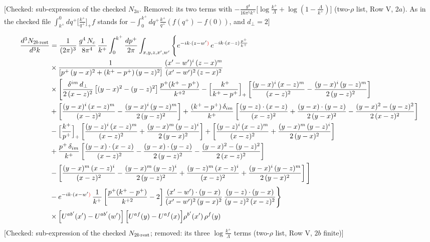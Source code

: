 \documentclass[9pt]{article}
\numberwithin{equation}{section}
\begin{document}
\begin{align}
\end{align} {\color{red}[Checked: sub-expression of the checked $N_{2a}$. Removed: its two terms with $-\frac{g^{4}}{16\pi^{5}k^{+}}\big[\log\frac{k^{+}}{\Lambda}+\log(1-\frac{\Lambda}{k^{+}})\big]$ (two-$\rho$ list, Row V, $2a$). As in the checked file $\int^{0}_{k^{+}}dq^{+}\big[\frac{k^{+}}{q^{+}}\big]_{+}f$ stands for $-\int_{0}^{k^{+}}dq^{+}\frac{k^{+}}{q^{+}}(f(q^{+})-f(0))$, and $d_{\perp}=2$]}\par\noindent 
\begin{align}
\frac{d^{3}N_{2b\,\rm rest}}{d^{3}k} & =\frac{1}{(2\pi)^{3}}\,\frac{g^{4}\,N_{c}}{8\pi^{4}}\,\frac{1}{k^{+}}\int_{0}^{k^{+}}\frac{dp^{+}}{2\pi}\int_{x,y,z,x',w'}\Bigg\{e^{-ik\cdot(z-w'{\color{red})}}\,e^{-ik\cdot(x-z)\frac{p^{+}}{k^{+}}}\notag \\ & \times\frac{1}{\left[p^{+}\,(y-x)^{2}+(k^{+}-p^{+})\,(y-z)^{2}\right]}\,\frac{(x'-w')^{i}\,(z-x)^{m}}{(x'-w')^{2}\,(z-x)^{2}}\notag\\
&\times\Bigg[\frac{\delta^{im}\,d_{\perp}}{2\,(x-z)^{2}}\left[(y-x)^{2}-(y-z)^{2}\right]\frac{p^{+}(k^{+}-p^{+})}{k^{+2}}
-\Big[\frac{k^{+}}{k^{+}-p^{+}}\Big]_{+}\left[\frac{(y-x)^{i}\,(x-z)^{m}}{(x-z)^{2}}-\frac{(y-x)^{i}\,(y-z)^{m}}{2\,(y-z)^{2}}\right]\notag\\
&+\left[\frac{(y-x)^{i}\,(x-z)^{m}}{(x-z)^{2}}-\frac{(y-x)^{i}\,(y-z)^{m}}{2\,(y-z)^{2}}\right]
+\frac{(k^{+}-p^{+})\,\delta_{im}}{k^{+}}\left[\frac{(y-z)\cdot(x-z)}{(x-z)^{2}}+\frac{(y-x)\cdot(y-z)}{2\,(y-x)^{2}}-\frac{(y-x)^{2}-(y-z)^{2}}{2\,(x-z)^{2}}\right]\notag\\
&-\Big[\frac{k^{+}}{p^{+}}\Big]_{+}\left[\frac{(y-z)^{i}\,(x-z)^{m}}{(x-z)^{2}}+\frac{(y-x)^{m}\,(y-z)^{i}}{2\,(y-x)^{2}}\right]+\left[\frac{(y-z)^{i}\,(x-z)^{m}}{(x-z)^{2}}+\frac{(y-x)^{m}\,(y-z)^{i}}{2\,(y-x)^{2}}\right]\notag\\
&+\frac{p^{+}\,\delta_{im}}{k^{+}}\left[\frac{(y-x)\cdot(x-z)}{(x-z)^{2}}-\frac{(y-x)\cdot(y-z)}{2\,(y-z)^{2}}-\frac{(y-x)^{2}-(y-z)^{2}}{2\,(x-z)^{2}}\right]\notag\\
&-\left[\frac{(y-x)^{m}\,(x-z)^{i}}{(x-z)^{2}}-\frac{(y-x)^{m}\,(y-z)^{i}}{2\,(y-z)^{2}}+\frac{(y-z)^{m}\,(x-z)^{i}}{(x-z)^{2}}+\frac{(y-x)^{i}\,(y-z)^{m}}{2\,(y-x)^{2}}\right]\Bigg]\notag\\
&-e^{-ik\cdot(x-w'{\color{red})}}\,\frac{1}{k^{+}}\left[\frac{p^{+}(k^{+}-p^{+})}{k^{+2}}-2\right]\frac{(x'-w')\cdot(y-x)}{(x'-w')^{2}\,(y-x)^{2}}\,\frac{(y-z)\cdot(y-x)}{(y-z)^{2}\,(x-z)^{2}}\Bigg\}\notag\\
&\times\Big[U^{ab'}(x')-U^{ab'}(w')\Big]\,\Big[U^{af}(y)-U^{af}(x)\Big]\rho^{b'}(x')\,\rho^{f}(y)
\end{align} {\color{red}[Checked: sub-expression of the checked $N_{2b\,\rm rest}$; removed: its three $\log\frac{k^{+}}{\Lambda}$ terms (two-$\rho$ list, Row V, $2b$ finite)]}\par\noindent 
\end{document}
